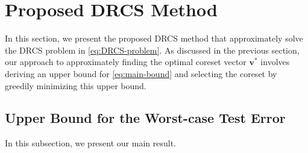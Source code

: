 \section{Proposed DRCS Method}
\label{sec:method}
%
In this section, we present the proposed DRCS method that approximately solve the DRCS problem in \eqref{eq:DRCS-problem}.
%
As discussed in the previous section, our approach to approximately finding the optimal coreset vector $\bm{v}^*$ involves deriving an upper bound for \eqref{eq:main-bound} and selecting the coreset by greedily minimizing this upper bound.



\subsection{Upper Bound for the Worst-case Test Error}
\label{subsec:UB_WC}
%
In this subsection, we present our main result.

